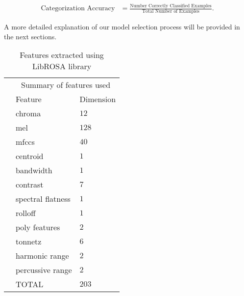 \documentclass[11pt]{article}
\begin{document}
\begin{align*}
    \text{Categorization Accuracy} &= \frac{\text{Number Correctly Classified Examples}}{\text{Total Number of Examples}}.
\end{align*}

A more detailed explanation of our model selection process will be provided in the next sections. 

  \begin{table}
    \centering
    \begin{tabular}{@{}lll@{}}
      &\multicolumn{2}{c}{Summary of features used} \\
      & Feature & Dimension \\
      \midrule
      & chroma & $12$ \\
      & mel & $128$\\
      & mfccs & $40$\\
      & centroid & $1$\\
      & bandwidth & $1$\\
      & contrast & $7$\\
      & spectral flatness & $1$\\
      & rolloff & $1$\\
      & poly features & $2$\\
      & tonnetz & $6$ \\
      & harmonic range & $2$ \\
      & percussive range & $2$ \\
      \midrule
      & TOTAL & $203$\\
      \bottomrule
      
    \end{tabular}
    
    \caption{\label{tab:features} Features extracted using LibROSA library}
  \end{table}
  
\end{document}
